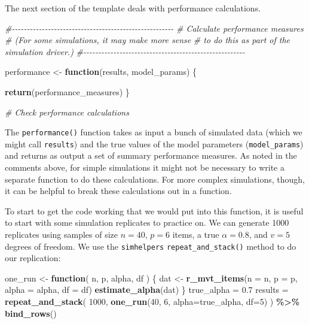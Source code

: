 \documentclass[
]{book}
\newenvironment{Shaded}{\begin{snugshade}}{\end{snugshade}}
\newcommand{\AttributeTok}[1]{\textcolor[rgb]{0.13,0.29,0.53}{#1}}
\newcommand{\CommentTok}[1]{\textcolor[rgb]{0.56,0.35,0.01}{\textit{#1}}}
\newcommand{\ControlFlowTok}[1]{\textcolor[rgb]{0.13,0.29,0.53}{\textbf{#1}}}
\newcommand{\DecValTok}[1]{\textcolor[rgb]{0.00,0.00,0.81}{#1}}
\newcommand{\FloatTok}[1]{\textcolor[rgb]{0.00,0.00,0.81}{#1}}
\newcommand{\FunctionTok}[1]{\textcolor[rgb]{0.13,0.29,0.53}{\textbf{#1}}}
\newcommand{\NormalTok}[1]{#1}
\newcommand{\OtherTok}[1]{\textcolor[rgb]{0.56,0.35,0.01}{#1}}
\newcommand{\SpecialCharTok}[1]{\textcolor[rgb]{0.81,0.36,0.00}{\textbf{#1}}}
\begin{document}
The next section of the template deals with performance calculations.

\begin{Shaded}
\begin{Highlighting}[]
\CommentTok{\#{-}{-}{-}{-}{-}{-}{-}{-}{-}{-}{-}{-}{-}{-}{-}{-}{-}{-}{-}{-}{-}{-}{-}{-}{-}{-}{-}{-}{-}{-}{-}{-}{-}{-}{-}{-}{-}{-}{-}{-}{-}{-}{-}{-}{-}{-}{-}{-}{-}{-}{-}{-}{-}{-}}
\CommentTok{\# Calculate performance measures}
\CommentTok{\# (For some simulations, it may make more sense}
\CommentTok{\# to do this as part of the simulation driver.)}
\CommentTok{\#{-}{-}{-}{-}{-}{-}{-}{-}{-}{-}{-}{-}{-}{-}{-}{-}{-}{-}{-}{-}{-}{-}{-}{-}{-}{-}{-}{-}{-}{-}{-}{-}{-}{-}{-}{-}{-}{-}{-}{-}{-}{-}{-}{-}{-}{-}{-}{-}{-}{-}{-}{-}{-}{-}}

\NormalTok{performance }\OtherTok{\textless{}{-}} \ControlFlowTok{function}\NormalTok{(results, model\_params) \{}

  \FunctionTok{return}\NormalTok{(performance\_measures)}
\NormalTok{\}}

\CommentTok{\# Check performance calculations}
\end{Highlighting}
\end{Shaded}

The \texttt{performance()} function takes as input a bunch of simulated data (which we might call \texttt{results}) and the true values of the model parameters (\texttt{model\_params}) and returns as output a set of summary performance measures. As noted in the comments above, for simple simulations it might not be necessary to write a separate function to do these calculations. For more complex simulations, though, it can be helpful to break these calculations out in a function.

To start to get the code working that we would put into this function, it is useful to start with some simulation replicates to practice on.
We can generate 1000 replicates using samples of size \(n = 40\), \(p = 6\) items, a true \(\alpha = 0.8\), and \(v = 5\) degrees of freedom.
We use the \texttt{simhelpers} \texttt{repeat\_and\_stack()} method to do our replication:

\begin{Shaded}
\begin{Highlighting}[]
\NormalTok{one\_run }\OtherTok{\textless{}{-}} \ControlFlowTok{function}\NormalTok{( n, p, alpha, df ) \{}
\NormalTok{  dat }\OtherTok{\textless{}{-}} \FunctionTok{r\_mvt\_items}\NormalTok{(}\AttributeTok{n =}\NormalTok{ n, }\AttributeTok{p =}\NormalTok{ p, }\AttributeTok{alpha =}\NormalTok{ alpha, }\AttributeTok{df =}\NormalTok{ df)}
  \FunctionTok{estimate\_alpha}\NormalTok{(dat)}
\NormalTok{\}}
\NormalTok{true\_alpha }\OtherTok{=} \FloatTok{0.7}
\NormalTok{results }\OtherTok{=} \FunctionTok{repeat\_and\_stack}\NormalTok{( }\DecValTok{1000}\NormalTok{, }
                            \FunctionTok{one\_run}\NormalTok{(}\DecValTok{40}\NormalTok{, }\DecValTok{6}\NormalTok{, }\AttributeTok{alpha=}\NormalTok{true\_alpha, }\AttributeTok{df=}\DecValTok{5}\NormalTok{) ) }\SpecialCharTok{\%\textgreater{}\%}
  \FunctionTok{bind\_rows}\NormalTok{()}
\end{Highlighting}
\end{Shaded}
\end{document}

